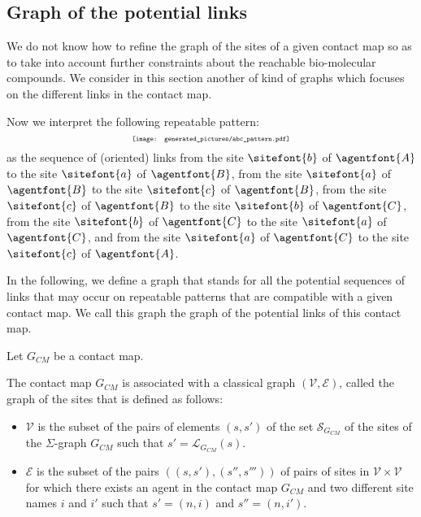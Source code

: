 \documentclass{entcs}
\newcommand{\graphsymb}{G}
\newcommand{\sites}[1][\graphsymb]{\mathcal{S}_{#1}}
\newcommand{\links}[1][\graphsymb]{\mathcal{L}_{#1}}
\begin{document}
\subsection{Graph of the potential links}

We do not know how to refine the graph of the sites of a given contact map so as to take into account further constraints about the reachable bio-molecular compounds. We consider in this section another of kind of graphs which focuses on the different links in the contact map.

Now we interpret the following repeatable pattern:
\begin{equation*}
\scalebox{0.6}{\texttt{[image: generated\_pictures/abc\_pattern.pdf]}}
\end{equation*}
as the sequence of (oriented) links from the
site $\sitefont{b}$ of $\agentfont{A}$ to the site
 $\sitefont{a}$ of $\agentfont{B}$,
 from the site $\sitefont{a}$ of $\agentfont{B}$ to the site $\sitefont{c}$ of $\agentfont{B}$,
 from the site $\sitefont{c}$ of $\agentfont{B}$ to the site $\sitefont{b}$ of $\agentfont{C}$,
 from the site $\sitefont{b}$ of $\agentfont{C}$ to the site $\sitefont{a}$ of $\agentfont{C}$, and from the site $\sitefont{a}$ of $\agentfont{C}$ to the site $\sitefont{c}$ of $\agentfont{A}$.

In the following, we define a graph that stands for all the potential sequences of links that may occur on repeatable patterns that are compatible with a given contact map. We call this graph the graph of the potential links of this contact map.

\begin{defn}
  Let $\graphsymb_{\textit{CM}}$ be a contact map.

  The contact map $\graphsymb_{\textit{CM}}$ is associated with a classical graph $(\mathcal{V},\mathcal{E})$, called the graph of the sites that is defined as follows:
  \begin{itemize}
    \item $\mathcal{V}$ is the subset of the pairs of elements $(s,s')$ of the set  $\sites[\graphsymb_{\textit{CM}}]$ of the sites of the $\Sigma$-graph $\graphsymb_{\textit{CM}}$ such that $s'=\links[\graphsymb_{\textit{CM}}](s)$.
    \item $\mathcal{E}$ is the subset of the pairs $((s,s'),(s'',s'''))$ of pairs of sites in $\mathcal{V}\times\mathcal{V}$ for which  there exists an agent in the contact map $\graphsymb_{\textit{CM}}$ and two different site names $i$ and $i'$ such that $s'=(n,i)$ and $s''=(n,i')$.
  \end{itemize}
  \end{defn}
\end{document}
